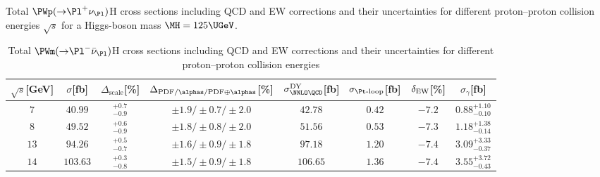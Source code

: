 \begin{table}
\caption{Total $\PWp({\to}\Pl^+\nu_{\Pl})$H cross sections including QCD and EW corrections
and their uncertainties for different proton--proton collision energies
$\sqrt{s}$ for a Higgs-boson mass $\MH=125\UGeV$.}
\label{tab:wph_XStot}
\begin{center}%
\begin{small}%
\begin{tabular}{cccccccc}%
\hline
$\sqrt{s}$[GeV] & $\sigma$[fb] & $\Delta_{\mathrm{scale}}$[\%] & 
$\Delta_{\mathrm{PDF}/\alphas/\mathrm{PDF\oplus\alphas}}$[\%] &
$\sigma_{\NNLO \QCD}^{\DY}$[fb] & $\sigma_{\Pt\mbox{\scriptsize -loop}}$[fb] & 
$\delta_{\mathrm{EW}}$[\%] & $\sigma_{\gamma}$[fb] 
\\
\hline
$7$ & $  40.99$ & ${}_{-0.9}^{+ 0.7}$ & $\pm1.9/\pm0.7/\pm 2.0$ & $  42.78$ & $   0.42$ & $-7.2$ & $ 0.88^{+1.10}_{-0.10}$ \\
$8$ & $  49.52$ & ${}_{-0.9}^{+ 0.6}$ & $\pm1.8/\pm0.8/\pm 2.0$ & $  51.56$ & $   0.53$ & $-7.3$ & $ 1.18^{+1.38}_{-0.14}$ \\
$13$ & $  94.26$ & ${}_{-0.7}^{+ 0.5}$ & $\pm1.6/\pm0.9/\pm 1.8$ & $  97.18$ & $   1.20$ & $-7.4$ & $3.09^{+3.33}_{-0.37}$ \\
$14$ & $ 103.63$ & ${}_{-0.8}^{+ 0.3}$ & $\pm1.5/\pm0.9/\pm 1.8$ & $ 106.65$ & $   1.36$ & $-7.4$ & $3.55^{+3.72}_{-0.43}$ \\
\hline
\end{tabular}%
\end{small}%
\end{center}%
\vspace{2em}
\caption{Total $\PWm({\to}\Pl^-\bar\nu_{\Pl})$H cross sections including QCD and EW corrections
and their uncertainties for different proton--proton collision energies
}
\end{table}
